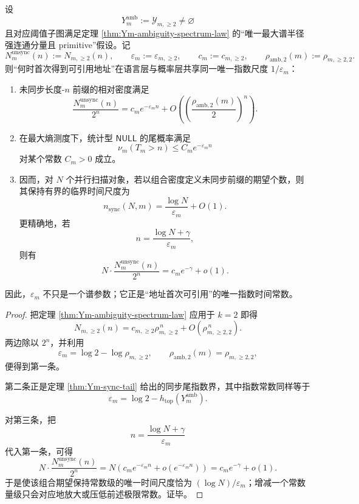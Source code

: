 \begin{theorem}[同步可寻址性的唯一指数时间尺度]\label{thm:conclusion-statnull-unique-exponential-address-time-scale}
设
\[
Y_m^{\mathrm{amb}}:=\mathcal Y_{m,\ge 2}\neq\varnothing
\]
且对应阈值子图满足定理 \ref{thm:Ym-ambiguity-spectrum-law} 的“唯一最大谱半径强连通分量且 primitive”假设。记
\[
N_m^{\mathrm{unsync}}(n):=N_{m,\ge 2}(n),
\qquad
\varepsilon_m:=\varepsilon_{m,\ge 2},
\qquad
c_m:=c_{m,\ge 2},
\qquad
\rho_{\mathrm{amb},2}(m):=\rho_{m,\ge 2,2}.
\]
则“何时首次得到可引用地址”在语言层与概率层共享同一唯一指数尺度 \(1/\varepsilon_m\)：
\begin{enumerate}
  \item 未同步长度-\(n\) 前缀的相对密度满足
  \[
  \frac{N_m^{\mathrm{unsync}}(n)}{2^n}
  =
  c_m e^{-\varepsilon_m n}
  +
  O\!\left(\left(\frac{\rho_{\mathrm{amb},2}(m)}{2}\right)^n\right).
  \]
  \item 在最大熵测度下，统计型 \(\mathsf{NULL}\) 的尾概率满足
  \[
  \nu_m(T_m>n)\le C_m e^{-\varepsilon_m n}
  \]
  对某个常数 \(C_m>0\) 成立。
  \item 因而，对 \(N\) 个并行扫描对象，若以组合密度定义未同步前缀的期望个数，则其保持有界的临界时间尺度为
  \[
  n_{\mathrm{sync}}(N,m)=\frac{\log N}{\varepsilon_m}+O(1).
  \]
  更精确地，若
  \[
  n=\frac{\log N+\gamma}{\varepsilon_m},
  \]
  则有
  \[
  N\cdot \frac{N_m^{\mathrm{unsync}}(n)}{2^n}
  =
  c_m e^{-\gamma}+o(1).
  \]
\end{enumerate}
因此，\(\varepsilon_m\) 不只是一个谱参数；它正是“地址首次可引用”的唯一指数时间常数。
\end{theorem}
\begin{proof}
把定理 \ref{thm:Ym-ambiguity-spectrum-law} 应用于 \(k=2\) 即得
\[
N_{m,\ge 2}(n)
=
c_{m,\ge 2}\rho_{m,\ge 2}^{\,n}
 + O(\rho_{m,\ge 2,2}^{\,n}).
\]
两边除以 \(2^n\)，并利用
\[
\varepsilon_m=\log 2-\log\rho_{m,\ge 2},
\qquad
\rho_{\mathrm{amb},2}(m)=\rho_{m,\ge 2,2},
\]
便得到第一条。

第二条正是定理 \ref{thm:Ym-sync-tail} 给出的同步尾指数界，其中指数常数同样等于
\[
\varepsilon_m=\log 2-h_{\mathrm{top}}(Y_m^{\mathrm{amb}}).
\]

对第三条，把
\[
n=\frac{\log N+\gamma}{\varepsilon_m}
\]
代入第一条，可得
\[
N\cdot \frac{N_m^{\mathrm{unsync}}(n)}{2^n}
=
N\left(c_m e^{-\varepsilon_m n}+o(e^{-\varepsilon_m n})\right)
=
c_m e^{-\gamma}+o(1).
\]
于是使该组合期望保持常数级的唯一时间尺度恰为 \((\log N)/\varepsilon_m\)；增减一个常数量级只会对应地放大或压低前述极限常数。证毕。
\end{proof}

